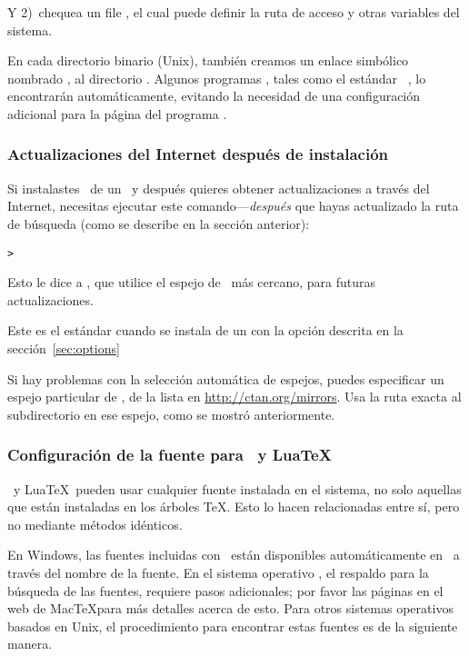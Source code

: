 \documentclass{article}
\begin{document}
Y 2)~chequea un file , el cual puede
definir la ruta de acceso y otras variables del sistema.

En cada directorio binario (Unix), también creamos un enlace simbólico
nombrado , al directorio .
Algunos programas , tales como el estándar \MacOSX\
, lo encontrarán automáticamente, evitando la necesidad de
una configuración adicional para la página del programa
.

\subsubsection{Actualizaciones del Internet después de instalación}
\label{sec:dvd-install-net-updates}

Si instalastes \TL\ de un \DVD\ y después quieres obtener
actualizaciones a través del Internet, necesitas ejecutar este
comando---\emph{después} que hayas actualizado la ruta de
búsqueda (como se describe en la sección anterior):

\begin{alltt}
> 
\end{alltt}

Esto le dice a , que utilice el espejo de \CTAN\ más
cercano, para futuras actualizaciones. 

Este es el estándar cuando se instala de un \DVD con la opción
descrita en la sección~\ref{sec:options}

Si hay problemas con la selección automática de espejos, puedes
especificar un espejo particular de \CTAN, de la lista en
\url{http://ctan.org/mirrors}. Usa la ruta exacta al subdirectorio
\dirname{tlnet} en ese espejo, como se mostró anteriormente.

\subsubsection{Configuración de la fuente para \XeTeX\ y Lua\TeX}
\label{sec:font-conf-sys}

\XeTeX\ y Lua\TeX\ pueden usar cualquier fuente instalada en el
sistema, no solo aquellas que están instaladas en los árboles \TeX.
Esto lo hacen relacionadas entre sí, pero no mediante métodos
idénticos. 

En Windows, las fuentes incluidas con \TL\ están disponibles
automáticamente en \XeTeX\ a través del nombre de la fuente. En el
sistema operativo \MacOSX, el respaldo para la búsqueda de las
fuentes, requiere pasos adicionales; por favor las páginas en el web
de Mac\TeX para más detalles acerca de esto. Para otros sistemas
operativos basados en Unix, el procedimiento para encontrar estas
fuentes es de la siguiente manera. 
\end{document}
